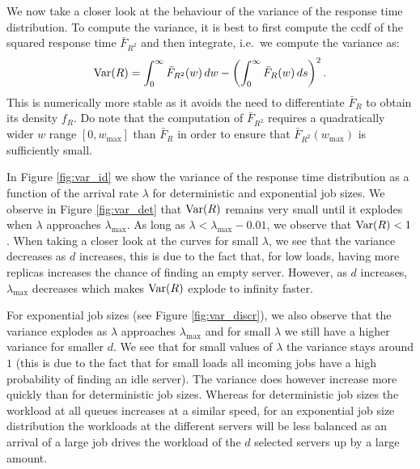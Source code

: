 \documentclass[12pt]{report}
\begin{document}
We now take a closer look at the behaviour of the variance of the response time distribution. To compute the variance, it is best to first compute the ccdf of the squared response time $\bar F_{R^2}$ and then integrate, i.e.~we compute the variance as:
$$\textup{Var}(R) = \int_0^\infty \bar F_{R^2}(w)\, dw - \left(\int_0^\infty \bar F_R(w)\, ds\right)^2.$$
This is numerically more stable as it avoids the need to differentiate $\bar F_R$ to obtain its density $f_R$. Do note that the computation of $\bar F_{R^2}$ requires a quadratically wider $w$ range $[0,w_{\max}]$ than $\bar F_R$ in order to ensure that $\bar F_{R^2}(w_{\max})$ is sufficiently small.

In Figure \ref{fig:var_id} we show the variance of the response time distribution as a function of the arrival rate $\lambda$ for deterministic and exponential job sizes. We observe in Figure \ref{fig:var_det} that $\textup{Var}(R)$ remains very small until it explodes when $\lambda$ approaches $\lambda_{\max}$. As long as $\lambda<\lambda_{\max}-0.01$, we observe that $\textup{Var}(R) <1$. When taking a closer look at the curves for small $\lambda$, we see that the variance decreases as $d$ increases, this is due to the fact that, for low loads, having more replicas increases the chance of finding an empty server. However, as $d$ increases, $\lambda_{\max}$ decreases which makes $\textup{Var}(R)$ explode to infinity faster.

For exponential job sizes (see Figure \ref{fig:var_discr}), we also observe that the variance explodes as $\lambda$ approaches $\lambda_{\max}$ and for small $\lambda$ we still have a higher variance for smaller $d$. We see that for small values of $\lambda$ the variance stays around $1$ (this is due to the fact that for small loads all incoming jobs have a high probability of finding an idle server). The variance does however increase more quickly than for deterministic job sizes. Whereas for deterministic job sizes the workload at all queues increases at a similar speed, for an exponential job size distribution the workloads at the different servers will be less balanced as an arrival of a large job drives the workload of the $d$ selected servers up by a large amount.
\end{document}
